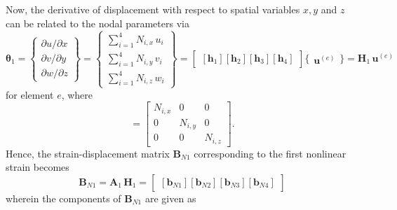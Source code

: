 Now, the derivative of displacement with respect to spatial variables $x, y$ and $z$ can be related to the nodal parameters via
\small
\begin{equation}
\boldsymbol{\theta}_1 =  \begin{Bmatrix}
\partial u / \partial x\\
\partial v / \partial y \\
\partial w / \partial z
\end{Bmatrix}
= \begin{Bmatrix}
\sum\nolimits_{i=1}^4 N_{i,x} \, u_i\\
\sum\nolimits_{i=1}^4 N_{i,y} \, v_i \\
\sum\nolimits_{i=1}^4 N_{i,z} \, w_i
\end{Bmatrix} 
= \begin{bmatrix}
[\mathbf{h}_1] [\mathbf{h}_2] [\mathbf{h}_3] [\mathbf{h}_4]
\end{bmatrix} \bigl\{ \begin{matrix} \mathbf{u}^{(e)} \end{matrix} \bigr\}  
= \mathbf{H}_1 \, \mathbf{u}^{(e)} 
\end{equation}
\normalsize
for element $e$, where 
\begin{equation}
[\mathbf{h}_i] = \begin{bmatrix}
N_{i,x} &  0 & 0  \\
0 & N_{i,y} & 0  \\
0 & 0 & N_{i,z}\end{bmatrix} .
\end{equation}
Hence, the strain-displacement matrix $\mathbf{B}_{N1}$ corresponding to the first nonlinear strain becomes
\begin{equation}
\mathbf{B}_{N1} = \mathbf{A}_1 \, \mathbf{H}_1 = \begin{bmatrix}
[\mathbf{b}_{N1}] [\mathbf{b}_{N2}] [\mathbf{b}_{N3}] [\mathbf{b}_{N4}] 
\end{bmatrix} 
\end{equation}
wherein the components of $\mathbf{B}_{N1}$ are given as
